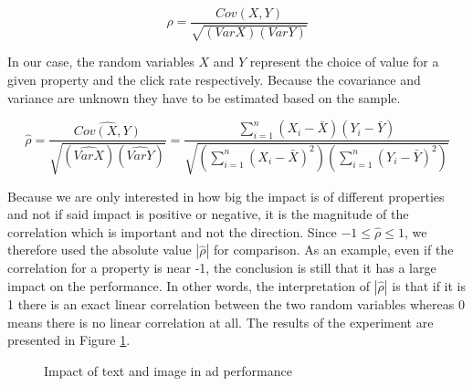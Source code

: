 \documentclass{sig-alternate}
\begin{document}
\begin{equation}
	\rho = \frac{Cov(X, Y)}{\sqrt{(Var X)(Var Y)}}
\end{equation}

In our case, the random variables \(X\) and \(Y\) represent the choice of value for a given property and the click rate respectively. Because the covariance and variance are unknown they have to be estimated based on the sample.

\begin{equation}
	\hat{\rho} = \frac{\widehat{Cov(X, Y)}}{\sqrt{(\widehat{Var X})(\widehat{Var Y})}} = \frac{ \sum_{i=1}^{n} (X_i - \bar{X})(Y_i - \bar{Y}) }{ \sqrt{ (\sum_{i=1}^{n} (X_i - \bar{X})^2) (\sum_{i=1}^{n} (Y_i - \bar{Y})^2) } }
\end{equation}

Because we are only interested in how big the impact is of different properties and not if said impact is positive or negative, it is the magnitude of the correlation which is important and not the direction. Since \(-1 \leq \hat{\rho} \leq 1 \), we therefore used the absolute value \(|\hat{\rho}|\) for comparison. As an example, even if the correlation for a property is near -1, the conclusion is still that it has a large impact on the performance. In other words, the interpretation of \(|\hat{\rho}|\) is that if it is 1 there is an exact linear correlation between the two random variables whereas 0 means there is no linear correlation at all. The results of the experiment are presented in Figure \ref{fig:PropertyImpact}.

\begin{figure}[htbp]
\begin{center}

	\caption{Impact of text and image in ad performance}
	\label{fig:PropertyImpact}
\end{center}
\end{figure}
\end{document}
